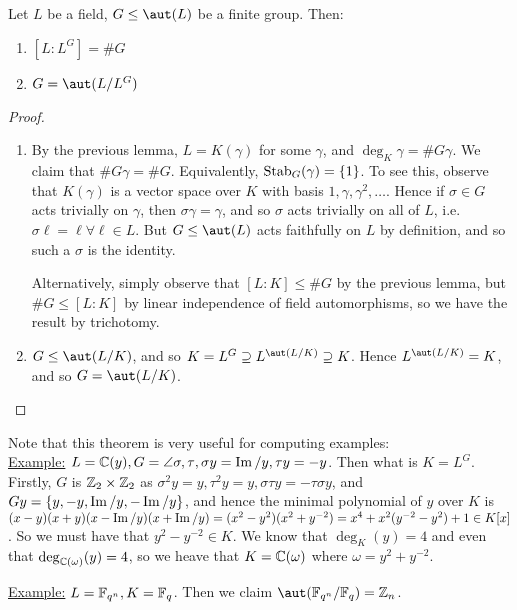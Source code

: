 \documentclass[a4paper, 10pt, twocolumn]{amsart}
\begin{document}
\begin{theorem}[Artin]
Let $L$ be a field, $G \leq \aut(L)$ be a finite group. Then:
\begin{enumerate}
\item $[L:L^G] = \#G$
\item $G = \aut(L/L^G)$
\end{enumerate}
\end{theorem}
\begin{proof}\item
\begin{enumerate}
\item By the previous lemma, $L = K(\gamma)$ for some $\gamma$, and $\deg_K \gamma = \# G\gamma$. We claim that $\#G\gamma = \#G$. Equivalently, $\operatorname{Stab}_G(\gamma) = \{1\}$. To see this, observe that $K(\gamma)$ is a vector space over $K$ with basis $1, \gamma, \gamma^2, \ldots$. Hence if $\sigma \in G$ acts trivially on $\gamma$, then $\sigma \gamma = \gamma$, and so $\sigma$ acts trivially on all of $L$, i.e. $\sigma\ell = \ell \forall \ell \in L$. But $G \leq \aut(L)$ acts faithfully on $L$ by definition, and so such a $\sigma$ is the identity. 

Alternatively, simply observe that $[L:K]\leq \#G$ by the previous lemma, but $\#G \leq [L:K]$ by linear independence of field automorphisms, so we have the result by trichotomy.

\item $G \leq \aut(L/K)$, and so $K = L^G \supseteq L^{\aut(L/K)} \supseteq K$. Hence $L^{\aut(L/K)} = K$, and so $G = \aut(L/K)$. 
\end{enumerate}
\end{proof}

Note that this theorem is very useful for computing examples:\\
\underline{Example:} $L = \mathbb{C}(y), G = \angle{\sigma, \tau}, \sigma y = \operatorname{Im}/y, \tau y = -y$. Then what is $K = L^G$. Firstly, $G$ is $\mathbb{Z}_2 \times \mathbb{Z}_2$ as $\sigma^2 y = y, \tau^2 y = y, \sigma \tau y = -\tau\sigma y$, and $Gy = \{y,-y, \operatorname{Im}/y, -\operatorname{Im}/y\}$, and hence the minimal polynomial of $y$ over $K$ is $(x-y)(x+y)(x-\operatorname{Im}/y)(x+\operatorname{Im}/y) = (x^2-y^2)(x^2+y^{-2}) = x^4 + x^2 (y^{-2}-y^2) + 1 \in K[x]$. So we must have that $y^2 - y^{-2} \in K$. We know that $\deg_K(y) = 4$ and even that $\deg_{\mathbb{C}(\omega)}(y) = 4$, so we heave that $K = \mathbb{C}(\omega)$ where $\omega = y^2+y^{-2}$.

\underline{Example:} $L = \mathbb{F}_{q^n}, K = \mathbb{F}_q$. Then we claim $\aut(\F_{q^n}/\F_q) = \Z_n$.
\end{document}
